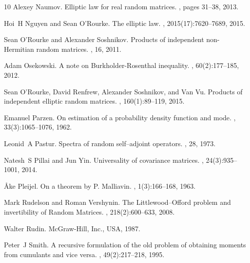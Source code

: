 \documentclass[11pt, a4paper, oneside]{book}
\numberwithin{equation}{chapter}
\begin{document}
\begin{thebibliography}{10}
Alexey Naumov.
\newblock Elliptic law for real random matrices.
, pages 31--38, 2013.

Hoi~H Nguyen and Sean O’Rourke.
\newblock The elliptic law.
, 2015(17):7620--7689, 2015.

Sean O'Rourke and Alexander Soshnikov.
\newblock Products of independent non-{H}ermitian random matrices.
, 16, 2011.

Adam Osekowski.
\newblock A note on {B}urkholder-{R}osenthal inequality.
, 60(2):177--185, 2012.

Sean O’Rourke, David Renfrew, Alexander Soshnikov, and Van Vu.
\newblock Products of independent elliptic random matrices.
, 160(1):89--119, 2015.

Emanuel Parzen.
\newblock On estimation of a probability density function and mode.
, 33(3):1065--1076, 1962.

Leonid~A Pastur.
\newblock Spectra of random self--adjoint operators.
, 28, 1973.

Natesh~S Pillai and Jun Yin.
\newblock Universality of covariance matrices.
, 24(3):935--1001, 2014.

{\AA}ke Pleijel.
\newblock On a theorem by {P. M}alliavin.
, 1(3):166--168, 1963.

Mark Rudelson and Roman Vershynin.
\newblock The {L}ittlewood--{O}fford problem and invertibility of {R}andom {M}atrices.
, 218(2):600--633, 2008.

Walter Rudin.
\newblock McGraw-Hill, Inc., USA, 1987.

Peter~J Smith.
\newblock A recursive formulation of the old problem of obtaining moments from cumulants and vice versa.
, 49(2):217--218, 1995.


\end{thebibliography}
\end{document}
